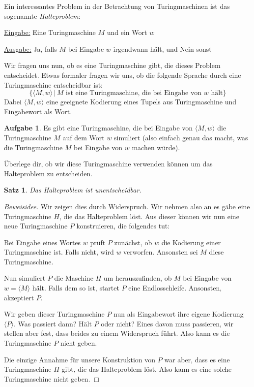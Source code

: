 \documentclass[a4paper,ngerman,12pt]{scrartcl}
\theoremstyle{definition}
\newtheorem{aufg}{Aufgabe}
\theoremstyle{plain}
\newtheorem{satz}[defn]{Satz}
\theoremstyle{remark}
\begin{document}
Ein interessantes Problem in der Betrachtung von Turingmaschinen ist das sogenannte \emph{Halteproblem}:

\underline{Eingabe:} Eine Turingmaschine $M$ und ein Wort $w$

\underline{Ausgabe:} Ja, falls $M$ bei Eingabe $w$ irgendwann hält, und Nein sonst

Wir fragen uns nun, ob es eine Turingmaschine gibt, die dieses Problem entscheidet. Etwas formaler fragen wir uns, ob die folgende Sprache durch eine Turingmaschine entscheidbar ist:
	\[\{\langle M, w\rangle \,|\, M \text{ ist eine Turingmaschine, die bei Eingabe von } w \text{ hält}\}\]
Dabei $\langle M, w\rangle$ eine geeignete Kodierung eines Tupels aus Turingmaschine und Eingabewort als Wort.

\begin{aufg}
	Es gibt eine Turingmaschine, die bei Eingabe von $\langle M, w\rangle$ die Turingmaschine $M$ auf dem Wort $w$ simuliert (also einfach genau das macht, was die Turingmaschine $M$ bei Eingabe von $w$ machen würde).
	
	Überlege dir, ob wir diese Turingmaschine verwenden können um das Halteproblem zu entscheiden.
\end{aufg}

\begin{satz}
	Das Halteproblem ist unentscheidbar.
\end{satz}

\begin{proof}[Beweisidee]
	Wir zeigen dies durch Widerspruch. Wir nehmen also an es gäbe eine Turingmaschine $H$, die das Halteproblem löst. Aus dieser können wir nun eine neue Turingmaschine $P$ konstruieren, die folgendes tut:
	
	Bei Eingabe eines Wortes $w$ prüft $P$ zunächst, ob $w$ die Kodierung einer Turingmaschine ist. Falls nicht, wird $w$ verworfen. Ansonsten sei $M$ diese Turingmaschine.
	
	Nun simuliert $P$ die Maschine $H$ um herauszufinden, ob $M$ bei Eingabe von $w = \langle M\rangle$ hält. Falls dem so ist, startet $P$ eine Endlosschleife. Ansonsten, akzeptiert $P$.
	
	Wir geben dieser Turingmaschine $P$ nun als Eingabewort ihre eigene Kodierung $\langle P\rangle$. Was passiert dann? Hält $P$ oder nicht? Eines davon muss passieren, wir stellen aber fest, dass beides zu einem Widerspruch führt. Also kann es die Turingmaschine $P$ nicht geben.
	
	Die einzige Annahme für unsere Konstruktion von $P$ war aber, dass es eine Turingmaschine $H$ gibt, die das Halteproblem löst. Also kann es eine solche Turingmaschine nicht geben.
\end{proof}
\end{document}
